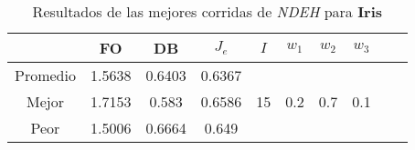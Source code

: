 \begin{table}[h!]
\footnotesize
\begin{center}
\begin{tabular}{|c|c|c|c|c|c|c|c|c|c|}
\hline
& {\bf FO} & {\bf DB}& $J_e$ & $I$ & $w_1$ & $w_2$ & $w_3$ \\
\hline
\hline
Promedio   & 1.5638 & 0.6403  & 0.6367 &  &  &  & \\
\cline{1-4}
Mejor & 1.7153 & 0.583  & 0.6586 & 15 & 0.2 & 0.7 & 0.1\\
\cline{1-4}
Peor & 1.5006 & 0.6664  & 0.649 &  &  &  & \\\hline
\end{tabular}
\caption{Resultados de las mejores corridas de \emph{NDEH} para {\bf Iris}}
\label{tb:pmpdehibcsv}
\end{center}
\end{table}
